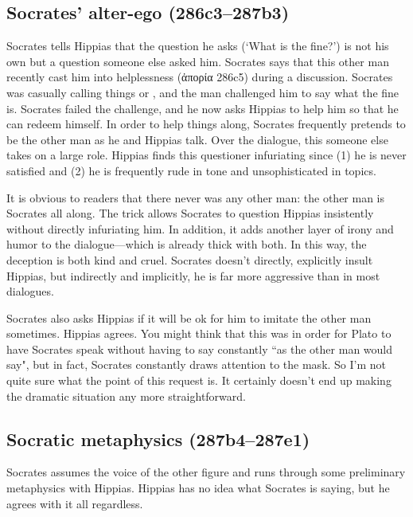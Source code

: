 \documentclass[11pt]{article}
\begin{document}
\subsection{Socrates' alter-ego (286c3--287b3)}

Socrates tells Hippias that the question he asks (`What is the fine?') is
not his own but a question someone else asked him.  Socrates says that this
other man recently cast him into helplessness ({\g ἀπορία} 286c5) during
a discussion.  Socrates was casually calling things  or
, and the man challenged him to say what the fine is.
Socrates failed the challenge, and he now asks Hippias to help him so that
he can redeem himself.  In order to help things along, Socrates frequently
pretends to be the other man as he and Hippias talk.  Over the dialogue,
this someone else takes on a large role.  Hippias finds this questioner
infuriating since (1) he is never satisfied and (2) he is frequently rude
in tone and unsophisticated in topics.

It is obvious to readers that there never was any other man: the other man
is Socrates all along.  The trick allows Socrates to question Hippias
insistently without directly infuriating him.  In addition, it adds another
layer of irony and humor to the dialogue---which is already thick with
both.  In this way, the deception is both kind and cruel.  Socrates doesn't
directly, explicitly insult Hippias, but indirectly and implicitly, he is
far more aggressive than in most dialogues.

Socrates also asks Hippias if it will be ok for him to imitate the other
man sometimes.  Hippias agrees.  You might think that this was in order for
Plato to have Socrates speak without having to say constantly ``as the
other man would say", but in fact, Socrates constantly draws attention to
the mask.  So I'm not quite sure what the point of this request is.  It
certainly doesn't end up making the dramatic situation any more
straightforward.


\subsection{Socratic metaphysics (287b4--287e1)}

Socrates assumes the voice of the other figure and runs through some
preliminary metaphysics with Hippias.  Hippias has no idea what Socrates is
saying, but he agrees with it all regardless.
\end{document}
